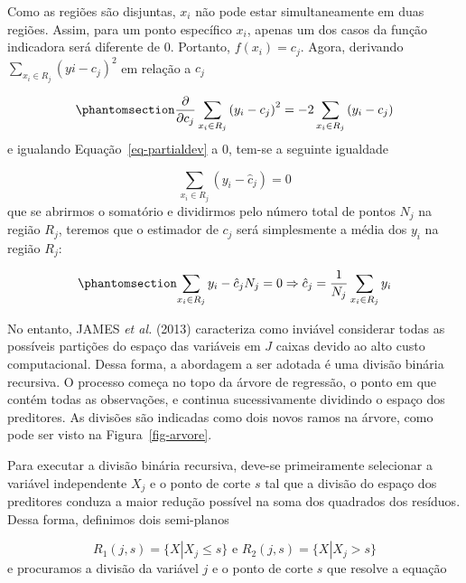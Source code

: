 \documentclass[
  12pt,
  a4paper,
]{scrreprt}
\begin{document}
Como as regiões são disjuntas, \(x_i\) não pode estar simultaneamente em
duas regiões. Assim, para um ponto específico \(x_i\), apenas um dos
casos da função indicadora será diferente de 0. Portanto,
\(f\left(x_i\right) = c_j\). Agora, derivando
\(\sum_{x_i \in R_j}\left(yi - c_j\right)^2\) em relação a \(c_j\)

\begin{equation}\phantomsection\label{eq-partialdev}{
\frac{\partial}{\partial{c_j}}\sum_{x_i \in R_j} \left(y_i - c_j\right)^2 = -2\sum_{x_i \in R_j} \left(y_i - c_j\right)
}\end{equation} e igualando Equação~\ref{eq-partialdev} a 0, tem-se a
seguinte igualdade

\[
\sum_{x_i \in R_j} \left(y_i - \hat{c}_j\right) = 0
\] que se abrirmos o somatório e dividirmos pelo número total de pontos
\(N_j\) na região \(R_j\), teremos que o estimador de \(c_j\) será
simplesmente a média dos \(y_i\) na região \(R_j\):

\begin{equation}\phantomsection\label{eq-estimacjdev}{
\sum_{x_i \in R_j} y_i - \hat{c}_j N_j = 0 \Rightarrow \hat{c}_j = \frac{1}{N_{j}}\sum_{x_i \in R_j} y_i
}\end{equation}

\vspace{12pt}

No entanto, JAMES \emph{et al.} (2013) caracteriza como inviável
considerar todas as possíveis partições do espaço das variáveis em \(J\)
caixas devido ao alto custo computacional. Dessa forma, a abordagem a
ser adotada é uma divisão binária recursiva. O processo começa no topo
da árvore de regressão, o ponto em que contém todas as observações, e
continua sucessivamente dividindo o espaço dos preditores. As divisões
são indicadas como dois novos ramos na árvore, como pode ser visto na
Figura~\ref{fig-arvore}.

\vspace{12pt}

Para executar a divisão binária recursiva, deve-se primeiramente
selecionar a variável independente \(X_j\) e o ponto de corte \(s\) tal
que a divisão do espaço dos preditores conduza a maior redução possível
na soma dos quadrados dos resíduos. Dessa forma, definimos dois
semi-planos

\[
R_{1}\left(j, s\right) = \{X | X_j \leq s\} \text{ e } R_{2}\left(j, s\right) = \{X | X_j > s\}
\] e procuramos a divisão da variável \(j\) e o ponto de corte \(s\) que
resolve a equação
\end{document}
